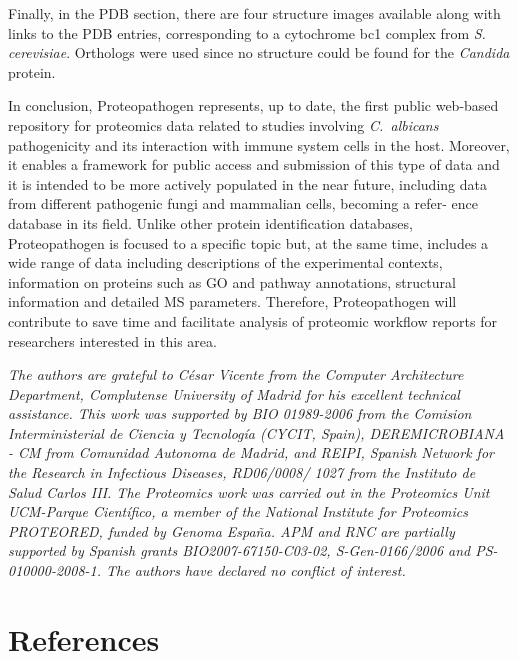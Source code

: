 Finally, in the PDB section, there are four structure
images available along with links to the PDB entries,
corresponding to a cytochrome bc1 complex from \textit{S. cerevisiae}.
 Orthologs were used since no structure could be found
for the \textit{Candida} protein.

In conclusion, Proteopathogen represents, up to date, the
first public web-based repository for proteomics data related
to studies involving \textit{\mbox{C. albicans}} pathogenicity and its interaction
 with immune system cells in the host. Moreover, it
enables a framework for public access and submission of
this type of data and it is intended to be more actively
populated in the near future, including data from different
pathogenic fungi and mammalian cells, becoming a refer-
ence database in its field. Unlike other protein identification
databases, Proteopathogen is focused to a specific topic but,
at the same time, includes a wide range of data including
descriptions of the experimental contexts, information on
proteins such as GO and pathway annotations, structural
information and detailed MS parameters. Therefore,
Proteopathogen will contribute to save time and facilitate
analysis of proteomic workflow reports for researchers
interested in this area.

\medskip

\textit{
The authors are grateful to C\'esar Vicente from the Computer
Architecture Department, Complutense University of Madrid for
his excellent technical assistance. This work was supported by
BIO 01989-2006 from the Comision Interministerial de Ciencia
y Tecnolog\'ia (CYCIT, Spain), DEREMICROBIANA - CM
from Comunidad Autonoma de Madrid, and REIPI, Spanish
Network for the Research in Infectious Diseases, RD06/0008/
1027 from the Instituto de Salud Carlos III. The Proteomics
work was carried out in the Proteomics Unit UCM-Parque
Cient\'ifico, a member of the National Institute for Proteomics
PROTEORED, funded by Genoma Espa\~na. APM and RNC are
partially supported by Spanish grants BIO2007-67150-C03-02,
S-Gen-0166/2006 and PS-010000-2008-1.
The authors have declared no conflict of interest.
}


\section*{References}


